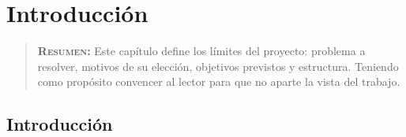 




\chapter{Introducción}
\label{ch:introduccion}

\begin{quote}
  {\bf\textsc{Resumen:}} Este capítulo define los límites del proyecto: problema a resolver, motivos de su elección, objetivos previstos y estructura. Teniendo como propósito convencer al lector para que no aparte la vista del trabajo.
\end{quote}


\section{Introducción}

